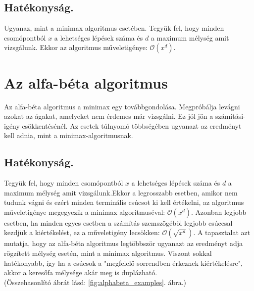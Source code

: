 \documentclass[twoside, a4paper, 12pt]{book}
\begin{document}
\subsection{Hatékonyság.} Ugyanaz, mint a minimax algoritmus esetében. Tegyük fel, hogy minden csomópontból $x$ a lehetséges lépések száma és $d$ a maximum mélység amit vizsgálunk. Ekkor az algoritmus műveletigénye: $ \mathcal{O}(x^d)$.

\section{Az alfa-béta algoritmus}
Az alfa-béta algoritmus a minimax egy továbbgondolása. Megpróbálja levágni azokat az ágakat, amelyeket nem érdemes már vizsgálni. Ez jól jön a számítási-igény csökkentésénél. Az esetek túlnyomó többségében ugyanazt az eredményt kell adnia, mint a minimax-algoritmusnak.

\subsection{Hatékonyság.} Tegyük fel, hogy minden csomópontból $x$ a lehetséges lépések száma és $d$ a maximum mélység amit vizsgálunk.Ekkor a legrosszabb esetben, amikor nem tudunk vágni és ezért minden terminális csúcsot ki kell értékelni, az algoritmus műveletigénye megegyezik a minimax algoritmuséval: $ \mathcal{O}(x^d)$.
Azonban legjobb esetben, ha minden egyes esetben a számítás szemszögéből legjobb csúccsal kezdjük a kiértékelést, ez a műveletigény lecsökken: $\mathcal{O}(\sqrt{x^d})$.
A tapasztalat azt mutatja, hogy az alfa-béta algoritmus legtöbbször ugyanazt az eredményt adja rögzített mélység esetén, mint a minimax algoritmus. Viszont sokkal hatékonyabb, így ha a csúcsok a "megfelelő sorrendben érkeznek kiértékelésre", akkor a keresőfa mélysége akár meg is duplázható. \\ (Összehasonlító ábrát lásd: \ref{fig:alphabeta_examples}. ábra.)
\end{document}
